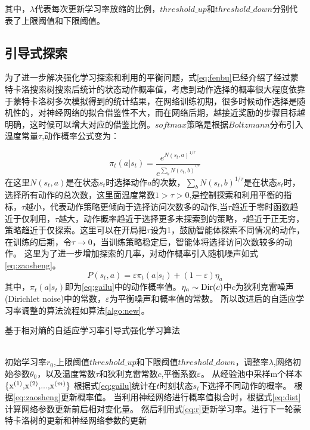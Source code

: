 其中，$\lambda$代表每次更新学习率放缩的比例，$threshold\_up$和$threshold\_down$分别代表了上限阈值和下限阈值。

\subsection{引导式探索}

为了进一步解决强化学习探索和利用的平衡问题，式\ref{eq:fenbu}已经介绍了经过蒙特卡洛搜索树搜索后统计的状态动作概率值，考虑到动作选择的概率很大程度依靠于蒙特卡洛树多次模拟得到的统计结果，在网络训练初期，很多时候动作选择是随机性的，对神经网络的拟合借鉴性不大，而在网络后期，越接近奖励的步骤目标越明确，这时候可以增大对应的借鉴比例。$softmax$策略是根据$Boltzmann$分布引入温度常量$\tau $,动作概率公式变为：

\begin{equation}
\label{eq:gailu}
{\pi _t}(a|{s_t}) = \frac{{{e^{N{{({s_t},a)}^{1/\tau }}}}}}{{{e^{\sum\nolimits_b {N{{({s_t},b)}^{^{1/\tau }}}} }}}}
\end{equation}
在这里${N({s_t},a)}$是在状态$s_t$时选择动作$a$的次数，${\sum\nolimits_b {N{{({s_t},b)}^{1/\tau }}} }$是在状态$s_t$时，选择所有动作的总次数，这里面温度常数$1>\tau>0$,是控制探索和利用平衡的指标，$\tau$越小，代表动作策略更倾向于选择访问次数多的动作,当$\tau$趋近于零时函数趋近于仅利用，$\tau$越大，动作概率趋近于选择更多未探索到的策略，$\tau$趋近于正无穷，策略趋近于仅探索。这里可以在开局把$\tau$设为1，鼓励智能体探索不同情况的动作，在训练的后期，令$\tau  \to 0$，当训练策略稳定后，智能体将选择访问次数较多的动作。
这里为了进一步增加探索的几率，对动作概率引入随机噪声如式\ref{eq:zaosheng}。
\begin{equation}
\label{eq:zaosheng}
	P({s_t},a) = \varepsilon{\pi _t}(a|{s_t}) + (1-\varepsilon) {\eta _a}
\end{equation}
其中，${\pi _t}(a|{s_t})$即为\ref{eq:gailu}中的动作概率值。${\eta _a} \sim {\rm{Dir}}(c)$中$c$为狄利克雷噪声(Dirichlet noise)中的常数，$\varepsilon$为平衡噪声和概率值的常数。
所以改进后的自适应学习率调整的算法流程如算法\ref{algo:new}。
\begin{algorithm}[htpb]
	\caption{基于相对熵的自适应学习率引导式强化学习算法}%
	\label{algo:new}
	\begin{algorithmic}[1]
		\Require ~~ \\
		初始学习率$r_0$,上限阈值$threshold\_up$和下限阈值$threshold\_down$，调整率$\lambda$,网络初始参数$\theta_0$，以及温度常数$\tau$和狄利克雷常数$c$,平衡系数$\varepsilon $。
		\State 从经验池中采样m个样本${\rm{\{ }}{{\rm{x}}^{(1)}}{\rm{,}}{{\rm{x}}^{(2)}}{\rm{,}}...{\rm{,}}{{\rm{x}}^{(m)}}{\rm{\} }}$
		\State 根据式\ref{eq:gailu}统计在$t$时刻状态$s_t$下选择不同动作的概率。
		\State 根据\ref{eq:zaosheng}更新概率值。
		\State 当利用神经网络进行概率值拟合时，根据式\ref{eq:dist}计算网络参数更新前后相对变化量。
		\State 然后利用式\ref{eq:r}更新学习率。进行下一轮蒙特卡洛树的更新和神经网络参数的更新
		\EndWhile
	\end{algorithmic}
\end{algorithm}

